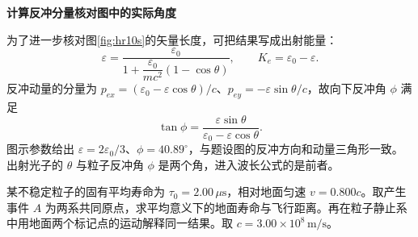 \begin{solution}
\par\medskip{}\noindent\textbf{计算反冲分量核对图中的实际角度}\par\nobreak
为了进一步核对图\ref{fig:hr10s}的矢量长度，可把结果写成出射能量：
\[
\varepsilon=\frac{\varepsilon_0}{1+\dfrac{\varepsilon_0}{mc^2}(1-\cos\theta)},\qquad
K_e=\varepsilon_0-\varepsilon.
\]
反冲动量的分量为 $p_{ex}=(\varepsilon_0-\varepsilon\cos\theta)/c$、$p_{ey}=-\varepsilon\sin\theta/c$，故向下反冲角 $\phi$ 满足
\[
\tan\phi=\frac{\varepsilon\sin\theta}{\varepsilon_0-\varepsilon\cos\theta}.
\]
图示参数给出 $\varepsilon=2\varepsilon_0/3$、$\phi=40.89^\circ$，与题设图的反冲方向和动量三角形一致。出射光子的 $\theta$ 与粒子反冲角 $\phi$ 是两个角，进入波长公式的是前者。
\end{solution}



\begin{question}
\begin{example}[寿命、飞行距离与同时性]\label{ex:r61}
某不稳定粒子的固有平均寿命为 \(\tau_0=2.00\,\mu\mathrm s\)，相对地面匀速 \(v=0.800c\)。取产生事件 \(A\) 为两系共同原点，求平均意义下的地面寿命与飞行距离。再在粒子静止系中用地面两个标记点的运动解释同一结果。取 \(c=3.00\times10^8\,\mathrm{m/s}\)。
\end{example}
\end{question}

